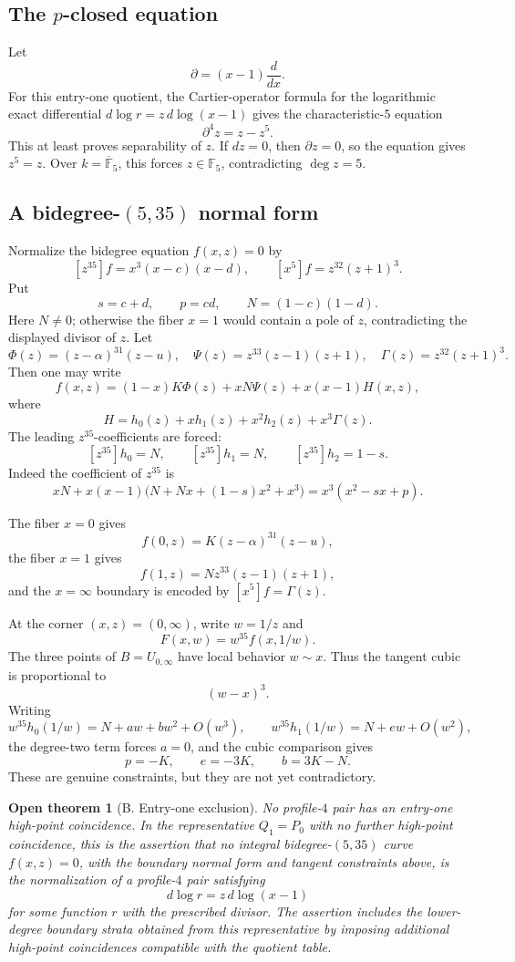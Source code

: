\documentclass[11pt]{amsart}
\newtheorem{opentheorem}[theorem]{Open theorem}
\newcommand{\kbar}{\overline{\mathbb F}_5}
\newcommand{\F}{\mathbb F}
\begin{document}
\subsection{The \(p\)-closed equation}

Let
\[
  \partial=(x-1)\frac{d}{dx}.
\]
For this entry-one quotient, the Cartier-operator formula for the logarithmic
exact differential \(d\log r=z\,d\log(x-1)\) gives the characteristic-\(5\)
equation
\[
  \partial^4z=z-z^5.
\]
This at least proves separability of \(z\).  If \(dz=0\), then
\(\partial z=0\), so the equation gives \(z^5=z\).  Over \(k=\kbar\), this
forces \(z\in\F_5\), contradicting \(\deg z=5\).

\subsection{A bidegree-\((5,35)\) normal form}

Normalize the bidegree equation \(f(x,z)=0\) by
\[
  [z^{35}]f=x^3(x-c)(x-d),\qquad
  [x^5]f=z^{32}(z+1)^3.
\]
Put
\[
  s=c+d,\qquad p=cd,\qquad N=(1-c)(1-d).
\]
Here \(N\ne0\); otherwise the fiber \(x=1\) would contain a pole of \(z\),
contradicting the displayed divisor of \(z\).
Let
\[
  \Phi(z)=(z-\alpha)^{31}(z-u),\quad
  \Psi(z)=z^{33}(z-1)(z+1),\quad
  \Gamma(z)=z^{32}(z+1)^3.
\]
Then one may write
\[
  f(x,z)=(1-x)K\Phi(z)+xN\Psi(z)+x(x-1)H(x,z),
\]
where
\[
  H=h_0(z)+xh_1(z)+x^2h_2(z)+x^3\Gamma(z).
\]
The leading \(z^{35}\)-coefficients are forced:
\[
  [z^{35}]h_0=N,\qquad [z^{35}]h_1=N,\qquad
  [z^{35}]h_2=1-s.
\]
Indeed the coefficient of \(z^{35}\) is
\[
  xN+x(x-1)\bigl(N+Nx+(1-s)x^2+x^3\bigr)
  =x^3(x^2-sx+p).
\]

The fiber \(x=0\) gives
\[
  f(0,z)=K(z-\alpha)^{31}(z-u),
\]
the fiber \(x=1\) gives
\[
  f(1,z)=N z^{33}(z-1)(z+1),
\]
and the \(x=\infty\) boundary is encoded by \([x^5]f=\Gamma(z)\).

At the corner \((x,z)=(0,\infty)\), write \(w=1/z\) and
\[
  F(x,w)=w^{35}f(x,1/w).
\]
The three points of \(B=U_{0,\infty}\) have local behavior \(w\sim x\).  Thus
the tangent cubic is proportional to
\[
  (w-x)^3.
\]
Writing
\[
  w^{35}h_0(1/w)=N+aw+bw^2+O(w^3),\qquad
  w^{35}h_1(1/w)=N+ew+O(w^2),
\]
the degree-two term forces \(a=0\), and the cubic comparison gives
\[
  p=-K,\qquad e=-3K,\qquad b=3K-N.
\]
These are genuine constraints, but they are not yet contradictory.

\begin{opentheorem}[B. Entry-one exclusion]
\label{open:entry-one}
No profile-\(4\) pair has an entry-one high-point coincidence.  In the
representative \(Q_1=P_0\) with no further high-point coincidence, this is the
assertion that no integral bidegree-\((5,35)\) curve \(f(x,z)=0\), with the
boundary normal form and tangent constraints above, is the normalization of a
profile-\(4\) pair satisfying
\[
  d\log r=z\,d\log(x-1)
\]
for some function \(r\) with the prescribed divisor.  The assertion includes
the lower-degree boundary strata obtained from this representative by imposing
additional high-point coincidences compatible with the quotient table.
\end{opentheorem}
\end{document}
